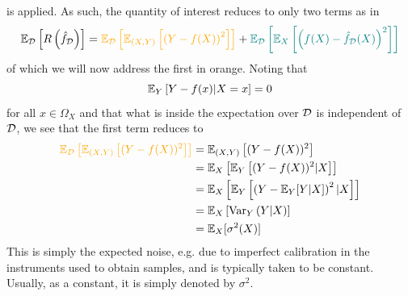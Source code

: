 \documentclass[11pt]{article}
\begin{document}
is applied. As such, the quantity of interest reduces to only two terms as in
$$
\E_{\D}\l[R\l(\hat{f}_{\D}\r)\r]
=
\textcolor{c5}{\E_{\D}\l[\E_{(X,Y)}\l[\l(Y-f(X)\r)^2\r]\r]}+\textcolor{c11}{\E_{\D}\l[\E_X\l[\l(f(X)-\hat{f}_{\D}(X)\r)^2\r]\r]}
$$
of which we will now address the first in orange. Noting that
$$
\mathbb{E}_{Y}\left[Y-f(x)|X=x\right]
=
0
$$
for all $x\in\Omega_X$ and that what is inside the expectation over $\mathcal{D}$ is independent of $\mathcal{D}$, we see that the first term reduces to
\begin{align*}
    \textcolor{c5}{\E_{\D}\l[\E_{(X,Y)}\l[(Y-f(X))^2\r]\r]}
    &=
    \E_{(X,Y)}\l[(Y-f(X))^2\r]\\
    &=
    \E_X\l[\E_{Y}\l[(Y-f(X))^2|X\r]\r]\\
    &=
    \E_X\l[\E_{Y}\l[\l(Y-\E_Y[Y|X]\r)^2|X\r]\r]\\
    &=
    \E_X\l[\text{Var}_Y\l(Y|X\r)\r]\\
    &=
    \E_X[\sigma^2(X)]
\end{align*}
This is simply the expected noise, e.g. due to imperfect calibration in the instruments used to obtain samples, and is typically taken to be constant. Usually, as a constant, it is simply denoted by $\sigma^2$.
\end{document}
